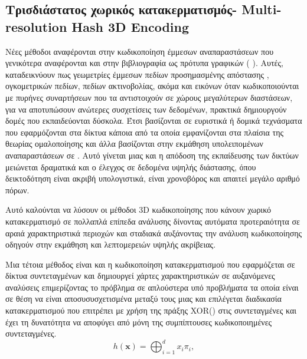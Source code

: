 \subsection{Τρισδιάστατος χωρικός κατακερματισμός- Multi-resolution Hash 3D Encoding}
 Νέες  μέθοδοι αναφέρονται στην κωδικοποίηση έμμεσων αναπαραστάσεων που γενικότερα αναφέρονται και στην βιβλιογραφία ως πρότυπα γραφικών ( \cite{mueller2022instant}). Αυτές, καταδεικνύουν  πως γεωμετρίες έμμεσων πεδίων προσημασμένης απόστασης , ογκομετρικών πεδίων, πεδίων ακτινοβολίας, ακόμα και εικόνων  όταν κωδικοποιούνται με πυρήνες συναρτήσεων που τα αντιστοιχούν σε χώρους μεγαλύτερων διαστάσεων, για να αποτυπώσουν ανώτερες συσχετίσεις των δεδομένων, πρακτικά δημιουργούν δομές που εκπαιδεύονται δύσκολα. Έτσι βασίζονται σε ευριστικά ή δομικά τεχνάσματα που εφαρμόζονται στα δίκτυα κάποια από τα οποία εμφανίζονται στα πλαίσια της θεωρίας ομαλοποίησης και άλλα βασίζονται στην εκμάθηση υπολειπομένων αναπαραστάσεων σε . Αυτό γίνεται μιας και η απόδοση της εκπαίδευσης των δικτύων μειώνεται δραματικά και ο έλεγχος σε δεδομένα υψηλής διάστασης, όπου δεικτοδότηση είναι ακριβή υπολογιστικά, είναι χρονοβόρος και απαιτεί μεγάλο αριθμό πόρων. 
 \par 
    Αυτό καλούνται να λύσουν οι μέθοδοι 3D κωδικοποίησης που κάνουν χωρικό κατακερματισμό σε πολλαπλά επίπεδα ανάλυσης δίνοντας αυτόματα προτεραιότητα σε αραιά χαρακτηριστικά περιοχών και σταδιακά αυξάνοντας την ανάλυση κωδικοποίησης οδηγούν στην εκμάθηση και λεπτομερειών υψηλής ακρίβειας.
\par 
    Μια τέτοια μέθοδος είναι και η κωδικοποίηση κατακερματισμού  που εφαρμόζεται σε δίκτυα συντεταγμένων και δημιουργεί χάρτες χαρακτηριστικών σε αυξανόμενες αναλύσεις επιμερίζοντας το πρόβλημα σε απλούστερα υπό προβλήματα τα οποία είναι σε θέση να είναι αποσυσυσχετισμένα μεταξύ τους μιας και επιλέγεται διαδικασία κατακερματισμού που επιτρέπει με χρήση της πράξης XOR() στις συντεταγμένες και έχει τη δυνατότητα να αποφύγει από μόνη της συμπίπτουσες κωδικοποιημένες συντεταγμένες. 
    \begin{equation*}
        h(\mathbf{x})=\bigoplus_{i=1}^{d}x_{i}\pi_{i}, 
        \label{eq:hashfunction}
    \end{equation*}

